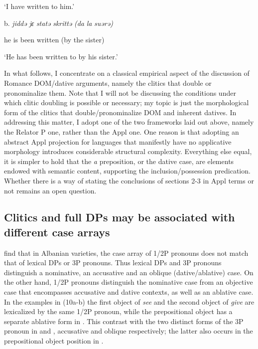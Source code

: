 \documentclass[output=paper,nonflat,modfonts]{langsci/langscibook}
\begin{document}
  ‘I have written to him.’

\begin{styleNoSpacing}
  b.  \textit{jiddə}   \textit{jɛ}   \textit{statə}   \textit{skrittə}   \textit{(da} \textit{la} \textit{suərə)}
\end{styleNoSpacing}

\begin{styleNoSpacing}
  he  is  been   written (by the sister)
\end{styleNoSpacing}

\begin{styleNoSpacing}
  ‘He has been written to by his sister.’
\end{styleNoSpacing}

In what follows, I concentrate on a classical empirical aspect of the discussion of Romance DOM/dative arguments, namely the clitics that double or pronominalize them. Note that I will not be discussing the conditions under which clitic doubling is possible or necessary; my topic is just the morphological form of the clitics that double/pronominalize DOM and inherent datives. In addressing this matter, I adopt one of the two frameworks laid out above, namely the Relator P one, rather than the Appl one. One reason is that adopting an abstract Appl projection for languages that manifestly have no applicative morphology introduces considerable structural complexity. Everything else equal, it is simpler to hold that the \textit{a} preposition, or the dative case, are elements endowed with semantic content, supporting the inclusion/possession predication. Whether there is a way of stating the conclusions of sections 2-3 in Appl terms or not remains an open question.

\subsection{ Clitics and full DPs may be associated with different case arrays}  %

\citet{ManziniSavoia2014} find that in Albanian varieties, the case array of 1/2P pronouns does not match that of lexical DPs or 3P pronouns. Thus lexical DPs and 3P pronouns distinguish a nominative, an accusative and an oblique (dative/ablative) case. On the other hand, 1/2P pronouns distinguish the nominative case from an objective case that encompasses accusative and dative contexts, as well as an ablative case. In the examples in (10a-b) the first object of \textit{see} and the second object of \textit{give} are lexicalized by the same 1/2P pronoun, while the prepositional object has a separate ablative form in . This contrast with the two distinct forms of the 3P pronoun in  and , accusative and oblique respectively; the latter also occurs in the prepositional object position in .  
\end{document}
